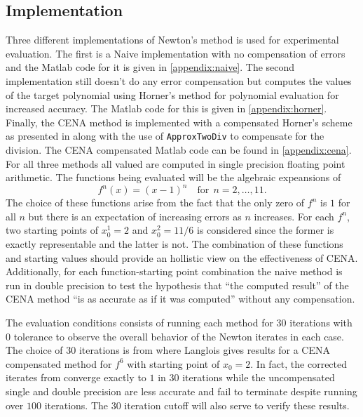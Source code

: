 \documentclass{standalone}
\begin{document}
	\subsection{Implementation}
	Three different implementations of Newton's method is used for experimental evaluation. The first is a Naive implementation with no compensation of errors and the Matlab code for it is given in \ref{appendix:naive}. The second implementation still doesn't do any error compensation but computes the values of the target polynomial using Horner's method for polynomial evaluation for increased accuracy. The Matlab code for this is given in \ref{appendix:horner}. Finally, the CENA method is implemented with a compensated Horner's scheme as presented in \cite{langlois2007ensure} along with the use of \texttt{ApproxTwoDiv} to compensate for the division. The CENA compensated Matlab code can be found in \ref{appendix:cena}. For all three methods all valued are computed in single precision floating point arithmetic. The functions being evaluated will be the algebraic expeansions of$$f^{n}(x)=(x-1)^{n}\quad\text{for}\:\:n=2,\dots,11.$$The choice of these functions arise from the fact that the only zero of $f^{n}$ is $1$ for all $n$ but there is an expectation of increasing errors as $n$ increases. For each $f^{n}$, two starting points of $x_{0}^{1}=2$ and $x_{0}^{2}=11/6$ is considered since the former is exactly representable and the latter is not. The combination of these functions and starting values should provide an hollistic view on the effectiveness of CENA. Additionally, for each function-starting point combination the naive method is run in double precision to test the hypothesis that ``the computed result'' of the CENA method ``is as accurate as if it was computed'' without any compensation. \cite{langlois2007ensure} \cite{langlois2001automatic} \cite{langlois2005solving}
	\par
	The evaluation conditions consists of running each method for $30$ iterations with $0$ tolerance to observe the overall behavior of the Newton iterates in each case. The choice of $30$ iterations is from \cite{langlois2004more} where Langlois gives results for a CENA compensated method for $f^{6}$ with starting point of $x_{0}=2$. In fact, the corrected iterates from \cite{langlois2004more} converge exactly to $1$ in $30$ iterations while the uncompensated single and double precision are less accurate and fail to terminate despite running over $100$ iterations. The $30$ iteration cutoff will also serve to verify these results.
	\par
\end{document}
